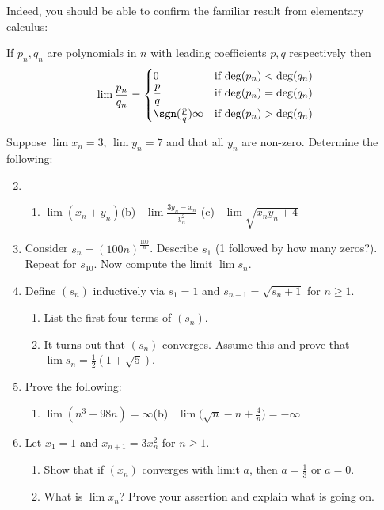 Indeed, you should be able to confirm the familiar result from elementary calculus:

\begin{cor}{}{}
	If $p_n,q_n$ are polynomials in $n$ with leading coefficients $p,q$ respectively then
	\[\lim\frac{p_n}{q_n}=\begin{cases}
	0&\text{if $\operatorname{deg}(p_n)<\operatorname{deg}(q_n)$}\\
	\dfrac pq&\text{if $\operatorname{deg}(p_n)=\operatorname{deg}(q_n)$}\\
	\sgn(\frac pq)\infty&\text{if $\operatorname{deg}(p_n)>\operatorname{deg}(q_n)$}
	\end{cases}\]
\end{cor}

\goodbreak


\begin{exercisessec}{}{}
\exstart Suppose $\lim x_n=3$, $\lim y_n=7$ and that all $y_n$ are non-zero. Determine the following:
\begin{enumerate}\setcounter{enumi}{1}
	\item[]%
  \begin{enumerate}
    \item $\lim(x_n+y_n)$\qquad (b) \ $\lim\frac{3y_n-x_n}{y_n^2}$ \qquad (c) \ $\lim \sqrt{x_ny_n+4}$
  \end{enumerate}
  
  
  \item Consider $s_n=(100n)^{\frac{100}n}$. Describe $s_1$ (1 followed by how many zeros?). Repeat for $s_{10}$. Now compute the limit $\lim s_n$.
  
  
  \item%
  Define $(s_n)$ inductively via $s_1=1$ and $s_{n+1}=\sqrt{s_n+1}$ for $n\ge 1$.
  \begin{enumerate}
	  \item List the first four terms of $(s_n)$.
	  \item It turns out that $(s_n)$ converges. Assume this and prove that $\lim s_n=\frac 12(1+\sqrt 5)$.
  \end{enumerate}
  
  
  \item Prove the following:
  \begin{enumerate}
    \item $\lim(n^3-98n)=\infty$\qquad\qquad (b) \ $\lim \bigl(\sqrt n-n+\frac 4n\bigr)=-\infty$
  \end{enumerate}
  
  
  \item%
  Let $x_1=1$ and $x_{n+1}=3x_n^2$ for $n\ge 1$.
  \begin{enumerate}
	  \item Show that if $(x_n)$ converges with limit $a$, then $a=\frac 13$ or $a=0$.
	  \item What is $\lim x_n$? Prove your assertion and explain what is going on.
  \end{enumerate}
  


\end{enumerate}
\end{exercisessec}
